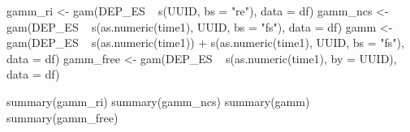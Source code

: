 gamm_ri <- gam(DEP_ES ~ s(UUID, bs = "re"), data = df)
gamm_ncs <- gam(DEP_ES ~ s(as.numeric(time1), UUID, bs = "fs"), data = df)
gamm <- gam(DEP_ES ~ s(as.numeric(time1)) +
  s(as.numeric(time1), UUID, bs = "fs"), data = df)
gamm_free <- gam(DEP_ES ~ s(as.numeric(time1), by = UUID), data = df)

summary(gamm_ri)
summary(gamm_ncs)
summary(gamm)
summary(gamm_free)